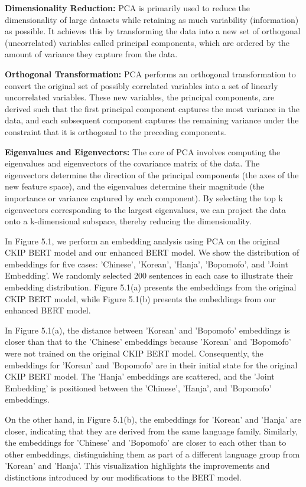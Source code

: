\documentclass[PhD]{PHlab-thesis}
\begin{document}
\textbf{Dimensionality Reduction:} PCA is primarily used to reduce the dimensionality of large datasets while retaining as much variability (information) as possible. It achieves this by transforming the data into a new set of orthogonal (uncorrelated) variables called principal components, which are ordered by the amount of variance they capture from the data.

\textbf{Orthogonal Transformation:} PCA performs an orthogonal transformation to convert the original set of possibly correlated variables into a set of linearly uncorrelated variables. These new variables, the principal components, are derived such that the first principal component captures the most variance in the data, and each subsequent component captures the remaining variance under the constraint that it is orthogonal to the preceding components.

\textbf{Eigenvalues and Eigenvectors:} The core of PCA involves computing the eigenvalues and eigenvectors of the covariance matrix of the data. The eigenvectors determine the direction of the principal components (the axes of the new feature space), and the eigenvalues determine their magnitude (the importance or variance captured by each component). By selecting the top k eigenvectors corresponding to the largest eigenvalues, we can project the data onto a k-dimensional subspace, thereby reducing the dimensionality.

In Figure 5.1, we perform an embedding analysis using PCA on the original CKIP BERT model and our enhanced BERT model. We show the distribution of embeddings for five cases: 'Chinese', 'Korean', 'Hanja', 'Bopomofo', and 'Joint Embedding'. We randomly selected 200 sentences in each case to illustrate their embedding distribution. Figure 5.1(a) presents the embeddings from the original CKIP BERT model, while Figure 5.1(b) presents the embeddings from our enhanced BERT model.

In Figure 5.1(a), the distance between 'Korean' and 'Bopomofo' embeddings is closer than that to the 'Chinese' embeddings because 'Korean' and 'Bopomofo' were not trained on the original CKIP BERT model. Consequently, the embeddings for 'Korean' and 'Bopomofo' are in their initial state for the original CKIP BERT model. The 'Hanja' embeddings are scattered, and the 'Joint Embedding' is positioned between the 'Chinese', 'Hanja', and 'Bopomofo' embeddings.

On the other hand, in Figure 5.1(b), the embeddings for 'Korean' and 'Hanja' are closer, indicating that they are derived from the same language family. Similarly, the embeddings for 'Chinese' and 'Bopomofo' are closer to each other than to other embeddings, distinguishing them as part of a different language group from 'Korean' and 'Hanja'. This visualization highlights the improvements and distinctions introduced by our modifications to the BERT model.
\end{document}
